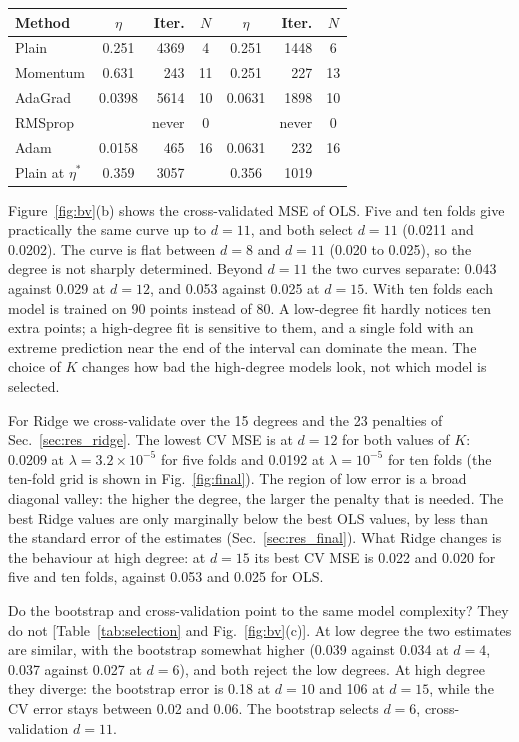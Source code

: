 \documentclass[aps,reprint,amsmath,amssymb,nofootinbib,floatfix]{revtex4-2}
\begin{document}
\begin{table}[t]
\begin{minipage}[t]{0.485\textwidth}
\begin{ruledtabular}
\begin{tabular}{lcrccrc}
Method & $\eta$ & Iter. & $N$ & $\eta$ & Iter. & $N$ \\
\hline
Plain & 0.251 & 4369 & 4 & 0.251 & 1448 & 6 \\
Momentum & 0.631 & 243 & 11 & 0.251 & 227 & 13 \\
AdaGrad & 0.0398 & 5614 & 10 & 0.0631 & 1898 & 10 \\
RMSprop &  & never & 0 &  & never & 0 \\
Adam & 0.0158 & 465 & 16 & 0.0631 & 232 & 16 \\
\hline
Plain at $\eta^*$ & 0.359 & 3057 &  & 0.356 & 1019 &  \\
\end{tabular}
\end{ruledtabular}
\end{minipage}
\end{table}

Figure~\ref{fig:bv}(b) shows the cross-validated MSE of OLS. Five and ten folds give practically
the same curve up to $d=11$, and both select $d=11$ (0.0211 and 0.0202). The curve is flat between
$d=8$ and $d=11$ (0.020 to 0.025), so the degree is not sharply determined. Beyond $d=11$ the two
curves separate: 0.043 against 0.029 at $d=12$, and 0.053 against 0.025 at $d=15$. With ten folds
each model is trained on 90 points instead of 80. A low-degree fit hardly notices ten extra
points; a high-degree fit is sensitive to them, and a single fold with an extreme prediction near
the end of the interval can dominate the mean. The choice of $K$ changes how bad the high-degree
models look, not which model is selected.

For Ridge we cross-validate over the 15 degrees and the 23 penalties of Sec.~\ref{sec:res_ridge}.
The lowest CV MSE is at $d=12$ for both values of $K$: 0.0209 at $\lambda=3.2\times10^{-5}$ for
five folds and 0.0192 at $\lambda=10^{-5}$ for ten folds (the ten-fold grid is shown in
Fig.~\ref{fig:final}). The region of low error is a broad diagonal valley: the higher the degree,
the larger the penalty that is needed. The best Ridge values are only marginally below the best
OLS values, by less than the standard error of the estimates (Sec.~\ref{sec:res_final}). What
Ridge changes is the behaviour at high degree: at $d=15$ its best CV MSE is 0.022 and 0.020 for
five and ten folds, against 0.053 and 0.025 for OLS.

Do the bootstrap and cross-validation point to the same model complexity? They do not
[Table~\ref{tab:selection} and Fig.~\ref{fig:bv}(c)]. At low degree the two estimates are
similar, with the bootstrap somewhat higher (0.039 against 0.034 at $d=4$, 0.037 against 0.027
at $d=6$), and both reject the low degrees. At high degree they diverge: the bootstrap error is
0.18 at $d=10$ and 106 at $d=15$, while the CV error stays between 0.02 and 0.06. The bootstrap
selects $d=6$, cross-validation $d=11$.
\end{document}

